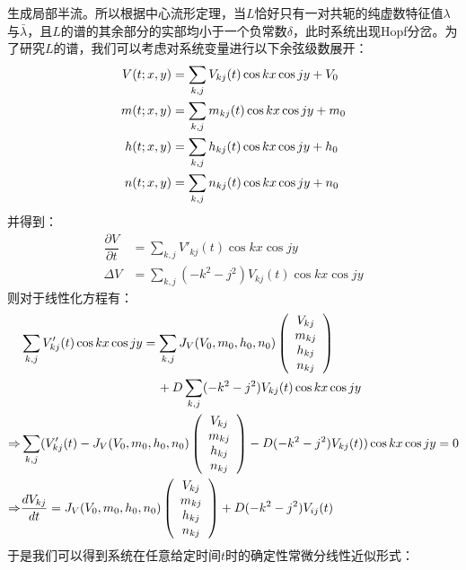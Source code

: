 \documentclass[
bachelor,
nofont, %
pdflinks,
]{xjtuthesis}
\begin{document}
生成局部半流。所以根据中心流形定理，当$L$恰好只有一对共轭的纯虚数特征值$\lambda$与$\bar{\lambda}$，且$L$的谱的其余部分的实部均小于一个负常数$\delta$，此时系统出现Hopf分岔。为了研究$L$的谱，我们可以考虑对系统变量进行以下余弦级数展开：
\begin{align}
\notag V(t;x,y)& =\sum_{k,j} V_{kj}(t)\cos kx \cos jy + V_0\\
m(t;x,y)& =\sum_{k,j} m_{kj}(t)\cos kx \cos jy +m_0\\
\notag h(t;x,y)& =\sum_{k,j} h_{kj}(t)\cos kx \cos jy +h_0\\
\notag n(t;x,y)& =\sum_{k,j} n_{kj}(t)\cos kx \cos jy +n_0
\end{align}
并得到：
\begin{align}
\dfrac{\partial V}{\partial t} &= \sum_{k,j} V'_{kj}(t)\cos kx \cos jy \\
\Delta V &= \sum_{k,j} (-k^2-j^2) V_{kj}(t)\cos kx \cos jy 
\end{align}
则对于线性化方程有：
\begin{align}
\notag &\sum_{k,j} V'_{kj}(t)\cos kx \cos jy = \sum_{k,j} J_{V}(V_0,m_0,h_0,n_0)
\left(
\begin{array}{c}
V_{kj}\\
m_{kj}\\
h_{kj}\\
n_{kj}
\end{array}
\right)\\
& \quad \quad \quad \quad \quad \quad \quad \quad \quad \quad \quad +D\sum_{k,j} (-k^2-j^2) V_{kj}(t)\cos kx \cos jy\\
\notag \Rightarrow & \sum_{k,j} (V'_{kj}(t)-J_{V}(V_0,m_0,h_0,n_0)
\left(
\begin{array}{c}
V_{kj}\\
m_{kj}\\
h_{kj}\\
n_{kj}
\end{array}
\right) -D(-k^2-j^2) V_{kj}(t))\cos kx \cos jy=0 \\
\Rightarrow & \dfrac{d V_{kj}}{d t}= J_{V}(V_0,m_0,h_0,n_0)
\left(
\begin{array}{c}
V_{kj}\\
m_{kj}\\
h_{kj}\\
n_{kj}
\end{array}
\right)+D(-k^2-j^2)V_{ij}(t)
\end{align}
于是我们可以得到系统在任意给定时间$t$时的确定性常微分线性近似形式：
\end{document}
